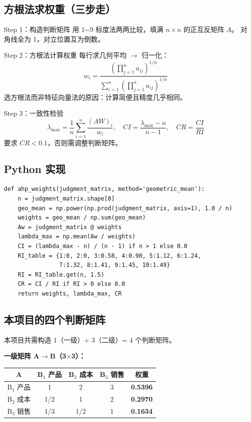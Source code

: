 \documentclass[a4paper,11pt]{ctexart}
\begin{document}
\subsection{方根法求权重（三步走）}

\begin{stepbox}{Step 1：构造判断矩阵}
用 1$\sim$9 标度法两两比较，填满 $n \times n$ 的正互反矩阵 $A$。
对角线全为 1，对立位置互为倒数。
\end{stepbox}

\begin{stepbox}{Step 2：方根法计算权重}
每行求几何平均 $\to$ 归一化：
\[
w_i = \frac{(\prod_{j=1}^{n} a_{ij})^{1/n}}{\sum_{i=1}^{n}(\prod_{j=1}^{n} a_{ij})^{1/n}}
\]
选方根法而非特征向量法的原因：计算简便且精度几乎相同。
\end{stepbox}

\begin{stepbox}{Step 3：一致性检验}
\[
\lambda_{\max} = \frac{1}{n}\sum_{i=1}^{n} \frac{(AW)_i}{w_i},\quad
CI = \frac{\lambda_{\max} - n}{n - 1},\quad
CR = \frac{CI}{RI}
\]
要求 $CR < 0.1$，否则需调整判断矩阵。
\end{stepbox}

\subsection{Python 实现}

\begin{lstlisting}
def ahp_weights(judgment_matrix, method='geometric_mean'):
    n = judgment_matrix.shape[0]
    geo_mean = np.power(np.prod(judgment_matrix, axis=1), 1.0 / n)
    weights = geo_mean / np.sum(geo_mean)
    Aw = judgment_matrix @ weights
    lambda_max = np.mean(Aw / weights)
    CI = (lambda_max - n) / (n - 1) if n > 1 else 0.0
    RI_table = {1:0, 2:0, 3:0.58, 4:0.90, 5:1.12, 6:1.24,
                7:1.32, 8:1.41, 9:1.45, 10:1.49}
    RI = RI_table.get(n, 1.5)
    CR = CI / RI if RI > 0 else 0.0
    return weights, lambda_max, CR
\end{lstlisting}

\subsection{本项目的四个判断矩阵}

本项目共需构造 1（一级）+ 3（二级）= 4 个判断矩阵。

\textbf{一级矩阵 A$\to$B（3$\times$3）：}

\begin{center}
\begin{tabular}{c|ccc|c}
\toprule
A & B$_1$ 产品 & B$_2$ 成本 & B$_3$ 销售 & \textbf{权重} \\
\midrule
B$_1$ 产品 & 1   & 2   & 3   & \textbf{0.5396} \\
B$_2$ 成本 & 1/2 & 1   & 2   & \textbf{0.2970} \\
B$_3$ 销售 & 1/3 & 1/2 & 1   & \textbf{0.1634} \\
\bottomrule
\end{tabular}
\end{center}
\end{document}
